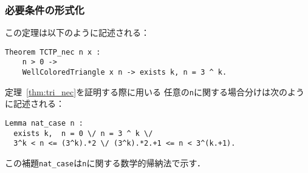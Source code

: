 
\subsubsection{必要条件の形式化}

この定理は以下のように記述される：
\begin{lstlisting}[language=Coq]
  Theorem TCTP_nec n x :
    n > 0 ->
    WellColoredTriangle x n -> exists k, n = 3 ^ k.
\end{lstlisting}

定理~\ref{thm:tri_nec}を証明する際に用いる
任意の{\tt{n}}に関する場合分けは次のように記述される：
\begin{lstlisting}[language=Coq]
  Lemma nat_case n :
  exists k,  n = 0 \/ n = 3 ^ k \/
  3^k < n <= (3^k).*2 \/ (3^k).*2.+1 <= n < 3^(k.+1).
\end{lstlisting}
この補題{\tt{nat\_case}}は{\tt{n}}に関する数学的帰納法で示す．

